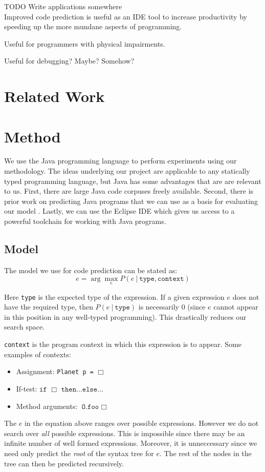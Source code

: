 \documentclass{article} %
\begin{document}
TODO Write applications somewhere\\
Improved code prediction is useful as an IDE tool to increase productivity by speeding up the more mundane aspects of programming.

Useful for programmers with physical impairments.

Useful for debugging? Maybe? Somehow?

\section*{Related Work}
\section*{Method}
We use the Java programming language to perform experiments using our methodology. The ideas underlying our project are applicable to any statically typed programming language, but Java has some advantages that are are relevant to us. First, there are large Java code corpuses freely available. Second, there is prior work on predicting Java programs that we can use as a basis for evaluating our model \cite{Bruch:2009:LEI:1595696.1595728}. Lastly, we can use the Eclipse IDE which gives us access to a powerful toolchain for working with Java programs.

\subsection*{Model}
The model we use for code prediction can be stated as:
$$ e = \arg\max_e P(e ~|~ \texttt{type} , \texttt{context} ) $$

Here \texttt{type} is the expected type of the expression. If a given expression $e$ does not have the required type, then $P(e ~|~ \texttt{type})$ is necessarily $0$ (since $e$ cannot appear in this position in any well-typed programming). This drastically reduces our search space.

\texttt{context} is the program context in which this expression is to appear. Some examples of contexts:
\begin{itemize}
  \item Assignment: \texttt{Planet p =} $\Box$
  \item If-test: $\texttt{if }\Box\texttt{ then}\ldots\texttt{else}\ldots$
  \item Method arguments: $\texttt{O.foo }\Box$
\end{itemize}

The $e$ in the equation above ranges over possible expressions. However we do not search over \emph{all} possible expressions. This is impossible since there may be an infinite number of well formed expressions. Moreover, it is unneccessary since we need only predict the \emph{root} of the syntax tree for $e$. The rest of the nodes in the tree can then be predicted recursively.
\end{document}
